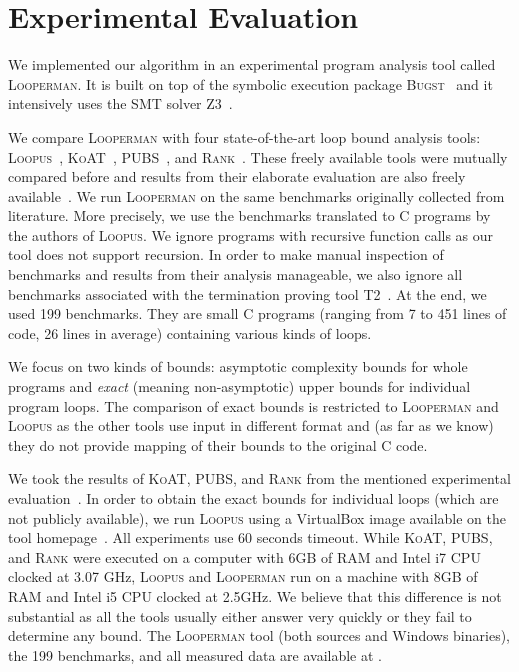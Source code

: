 \documentclass[10pt,a4paper]{article}
\newcommand{\Looperman}{\textsc{Looperman}\xspace}
\newcommand{\Loopus}{\textsc{Loopus}\xspace}
\newcommand{\KoAT}{\textsc{KoAT}\xspace}
\newcommand{\PUBS}{\textsc{PUBS}\xspace}
\newcommand{\Rank}{\textsc{Rank}\xspace}
\begin{document}
\section{Experimental Evaluation}\label{sec:eval}

We implemented our algorithm in an experimental program analysis tool called
\Looperman. It is built on top of the symbolic execution package
\textsc{Bugst}~\cite{BugstURL} and it intensively uses the SMT solver
\textsc{Z3}~\cite{Z3URL}.

We compare \Looperman with four state-of-the-art loop bound analysis
tools: \Loopus~\cite{Loopus2014}, \KoAT~\cite{KoAT2014},
\PUBS~\cite{PUBS2008}, and \Rank~\cite{Rank2010}.  These freely
available tools were mutually compared before and results from their
elaborate evaluation are also freely
available~\cite{KoAT_EvalData,Loopus_EvalData}. We run \Looperman on
the same benchmarks originally collected from literature.  More
precisely, we use the benchmarks
translated to C programs by the authors of \Loopus. We ignore programs
with recursive function calls as our tool does not support recursion.
In order to make manual inspection of benchmarks and results from
their analysis manageable, we also ignore all benchmarks associated
with the termination proving tool \textsc{T2}~\cite{T2}. At the end,
we used 199 benchmarks. They are small C programs (ranging from 7 to
451 lines of code, 26 lines in average) containing various kinds of
loops.



We focus on two kinds of bounds: asymptotic complexity bounds for
whole programs and \emph{exact} (meaning non-asymptotic) upper bounds
for individual program loops. The comparison of exact bounds is
restricted to \Looperman and \Loopus as the other tools use input in
different format and (as far as we know) they do not provide mapping
of their bounds to the original C code.

We took the results of \KoAT, \PUBS, and \Rank from the mentioned
experimental evaluation~\cite{KoAT_EvalData}.  In order to obtain the
exact bounds for individual loops (which are not publicly available),
we run \Loopus using a VirtualBox image available on the tool
homepage~\cite{LoopusWeb}. All experiments use 60 seconds
timeout. While \KoAT, \PUBS, and \Rank were executed on a computer
with 6GB of RAM and Intel i7 CPU clocked at 3.07 GHz, \Loopus and
\Looperman run on a machine with 8GB of RAM and Intel i5 CPU clocked
at 2.5GHz. We believe that this difference is not substantial as all
the tools usually either answer very quickly or they fail to determine
any bound. The \Looperman tool (both sources and Windows binaries),
the 199 benchmarks, and all measured data are available at \cite{EVALDATA}.
\end{document}

